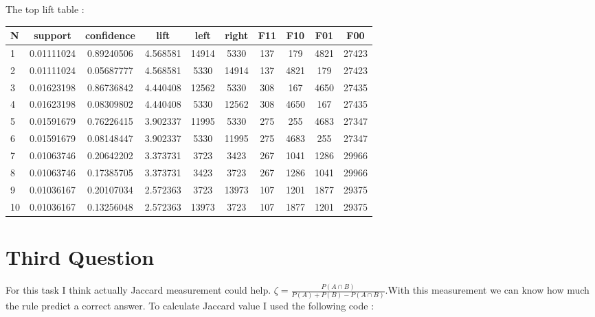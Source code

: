 \documentclass{article}
\begin{document}
The top lift table : \\
\begin{tabular}{|l|*{9}{c|}}
	\hline
N&support&confidence&lift&left&right&F11&F10&F01&F00\\\hline
1&0.01111024&0.89240506&4.568581&14914&5330&137&179&4821&27423\\\hline
2&0.01111024&0.05687777&4.568581&5330&14914&137&4821&179&27423\\\hline
3&0.01623198&0.86736842&4.440408&12562&5330&308&167&4650&27435\\\hline
4&0.01623198&0.08309802&4.440408&5330&12562&308&4650&167&27435\\\hline
5&0.01591679&0.76226415&3.902337&11995&5330&275&255&4683&27347\\\hline
6&0.01591679&0.08148447&3.902337&5330&11995&275&4683&255&27347\\\hline
7&0.01063746&0.20642202&3.373731&3723&3423&267&1041&1286&29966\\\hline
8&0.01063746&0.17385705&3.373731&3423&3723&267&1286&1041&29966\\\hline
9&0.01036167&0.20107034&2.572363&3723&13973&107&1201&1877&29375\\\hline
10&0.01036167&0.13256048&2.572363&13973&3723&107&1877&1201&29375\\\hline
\end{tabular}
\section*{Third Question}
For this task I think actually Jaccard measurement could help. \(\zeta = \frac{P(A\cap B)}{P(A)+P(B)-P(A\cap B)}\).With this measurement we can know how much the rule predict a correct answer.
To calculate Jaccard value I used the following code :
\end{document}
